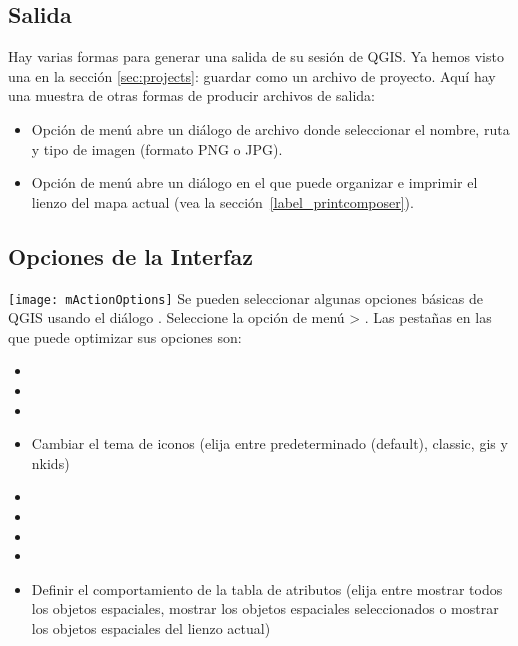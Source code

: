 \subsection{Salida}\label{sec:output}
Hay varias formas para generar una salida de su sesión de QGIS. Ya hemos visto una en
la sección \ref{sec:projects}: guardar como un archivo de proyecto. Aquí hay una muestra
de otras formas de producir archivos de salida:
\begin{itemize}
\item Opción de menú  abre un diálogo de archivo donde seleccionar el nombre, ruta y tipo de imagen (formato PNG o JPG).
\item Opción de menú  abre un
diálogo en el que puede organizar e imprimir el lienzo del mapa actual (vea la
sección~\ref{label_printcomposer}).
\end{itemize}


\subsection{Opciones de la Interfaz}
\label{subsec:gui_options}
\texttt{[image: mActionOptions]} 
Se pueden seleccionar algunas opciones básicas de QGIS usando el diálogo .
Seleccione la opción de menú  >
 . Las pestañas en las que puede optimizar
sus opciones son:


\begin{itemize}
\item {}
\item {}
\item {}
\item Cambiar el tema de iconos (elija entre predeterminado (default), classic, gis y nkids)
\item {}
\item {}
\item {}
\item {}
\item Definir el comportamiento de la tabla de atributos (elija entre mostrar todos los
objetos espaciales, mostrar los objetos espaciales seleccionados o mostrar los objetos
espaciales del lienzo actual)
\end{itemize}

